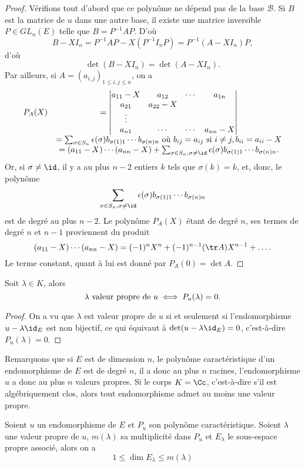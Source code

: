 \documentclass[class=report,crop=false]{standalone}
\begin{document}
\begin{proof}


Vérifions tout d'abord que ce polynôme ne dépend pas de la base $\mathcal{B}$. Si $B$ est la matrice de $u$ dans une autre base, il existe une matrice inversible $P\in GL_n(E)$ telle que $B=P^{-1}AP$.
D'où
$$B-XI_n=P^{-1}AP-X(P^{-1}I_nP)=P^{-1}(A-XI_n)P,$$
d'où
$$\det(B-XI_n)=\det(A-XI_n).$$
Par ailleurs, si $A=(a_{i,j})_{1\leq i,j\leq n}$, on a
$$\begin{array}{cc}P_A(X)&=\left|
\begin{matrix}a_{11}-X&a_{12}&\cdots&a_{1n}\cr a_{21}&a_{22}-X& & \cr
\vdots& & & \cr a_{n1}&\cdots &\cdots&a_{nn}-X\end{matrix}\right|\cr
&=\sum_{\sigma\in S_n}\epsilon(\sigma)b_{\sigma(1)1}\cdots b_{\sigma(n)n}\ {\hbox{où}}\ b_{ij}=a_{ij}\ {\hbox{si}}\ i\neq j, b_{ii}=a_{ii}-X\cr
&=(a_{11}-X)\cdots(a_{nn}-X)
+\sum_{\sigma\in S_n,\sigma\neq\id}\epsilon(\sigma)b_{\sigma(1)1}\cdots b_{\sigma(n)n}.\end{array}$$
Or, si $\sigma\neq\id$, il y a au plus $n-2$ entiers $k$ tels que $\sigma(k)=k$, et, donc, le polynôme
$$\sum_{\sigma\in S_n,\sigma\neq\id}\epsilon(\sigma)b_{\sigma(1)1}\cdots b_{\sigma(n)n}$$
est de degré au plus $n-2$. Le polynôme $P_A(X)$ étant de degré $n$, ses termes de degré
$n$ et $n-1$ proviennent du produit 
$$(a_{11}-X)\cdots(a_{nn}-X)=(-1)^nX^n+(-1)^{n-1}(\tr A)X^{n-1}+\dots.$$ 
Le terme constant, quant à lui est donné par $P_A(0)=\det A$.
\end{proof}


\begin{proposition}
Soit $\lambda\in K$, alors
$$\lambda\  {\rm valeur\  propre\  de}\ u\iff P_u(\lambda)=0. $$
\end{proposition}
 

\begin{proof}
On a vu que $\lambda$ est valeur propre de $u$ si et seulement 
si l'endomorphisme $u-\lambda\id_E$ est non bijectif, 
ce qui équivaut à $\det(u-\lambda\id_E)=0$, c'est-à-dire $P_u(\lambda)=0$.
\end{proof}


Remarquons que si $E$ est de dimension $n$, le polynôme 
caractéristique d'un endomorphisme de $E$ est de degré $n$, 
il a donc au plus $n$ racines, l'endomorphisme $u$ a donc au 
plus $n$ valeurs propres. Si le corps $K=\Cc$, c'est-à-dire 
s'il est algébriquement clos, alors tout endomorphisme admet 
au moins une valeur propre.


\begin{theoreme}
Soient $u$ un endomorphisme de $E$ et $P_u$ son polynôme caractéristique.
Soient $\lambda$ une valeur propre de $u$, $m(\lambda)$ sa multiplicité dans $P_u$ et $E_\lambda$
le sous-espace propre associé, alors on a
$$1\leq \dim E_\lambda\leq m(\lambda)$$
\end{theoreme} 
\end{document}
